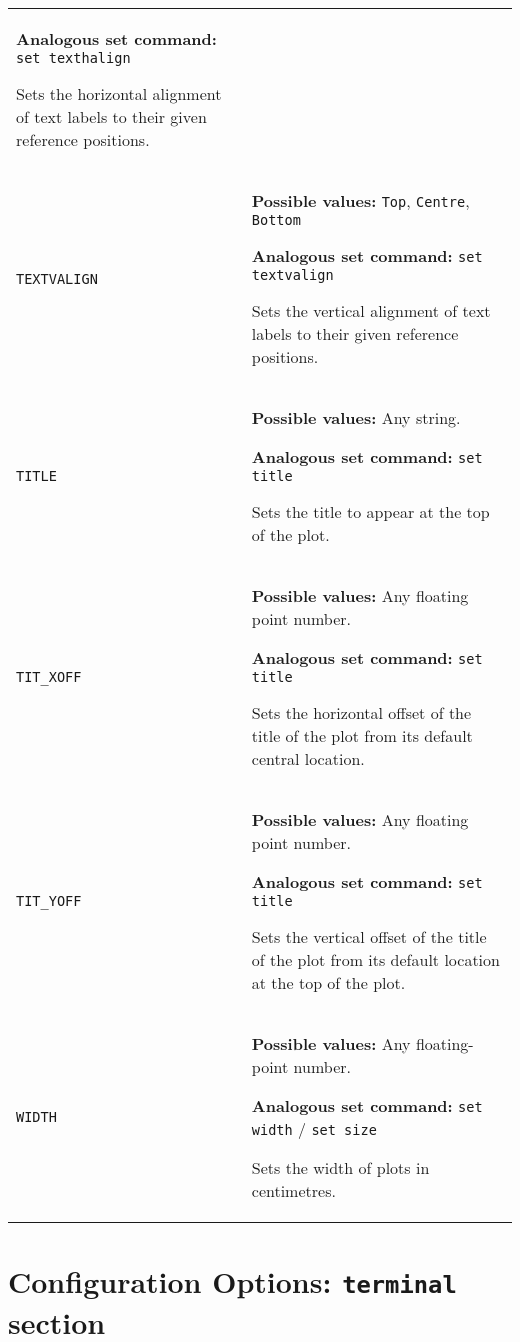 \documentclass[a4paper,onecolumn,11pt]{book}
\begin{document}
\begin{longtable}{p{3.4cm}p{9cm}}
                   \textbf{Analogous set command:} \texttt{set texthalign}\index{set texthalign command@\texttt{set texthalign} command}

                   Sets the horizontal alignment of text labels to their given reference positions.
                   \\
\texttt{TEXTVALIGN} & \textbf{Possible values:} \texttt{Top}, \texttt{Centre}, \texttt{Bottom}

                   \textbf{Analogous set command:} \texttt{set textvalign}\index{set textvalign command@\texttt{set textvalign} command}

                   Sets the vertical alignment of text labels to their given reference positions.
                   \\
\texttt{TITLE} & \textbf{Possible values:} Any string.

                   \textbf{Analogous set command:} \texttt{set title}\index{set title command@\texttt{set title} command}

                   Sets the title to appear at the top of the plot.
                   \\
\texttt{TIT\_XOFF} & \textbf{Possible values:} Any floating point number.

                   \textbf{Analogous set command:} \texttt{set title}

                   Sets the horizontal offset of the title of the plot from its default central location.
                   \\
\texttt{TIT\_YOFF} & \textbf{Possible values:} Any floating point number.

                   \textbf{Analogous set command:} \texttt{set title}

                   Sets the vertical offset of the title of the plot from its default location at the top of the plot.
                   \\
\texttt{WIDTH} & \textbf{Possible values:} Any floating-point number.

                   \textbf{Analogous set command:} \texttt{set width} / \texttt{set size}\index{set width command@\texttt{set width} command}\index{set size command@\texttt{set size} command}

                   Sets the width of plots in centimetres.
                   \\
\end{longtable}

\section{Configuration Options: \texttt{terminal} section}
\label{configfile_terminal}
\end{document}
